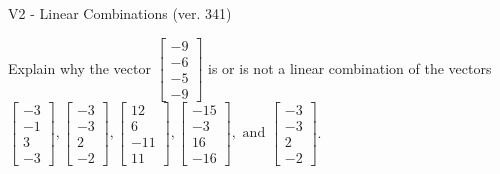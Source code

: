 \begin{exercise}
  \begin{exerciseTitle}V2 - Linear Combinations (ver. 341)\end{exerciseTitle}
  \begin{exerciseStatement}
    Explain why the vector \(\left[\begin{array}{c}
-9 \\
-6 \\
-5 \\
-9
\end{array}\right]\)  is or is not a linear 
	combination of the vectors \(\left[\begin{array}{c}
-3 \\
-1 \\
3 \\
-3
\end{array}\right] , \left[\begin{array}{c}
-3 \\
-3 \\
2 \\
-2
\end{array}\right] , \left[\begin{array}{c}
12 \\
6 \\
-11 \\
11
\end{array}\right] , \left[\begin{array}{c}
-15 \\
-3 \\
16 \\
-16
\end{array}\right] , \text{ and } \left[\begin{array}{c}
-3 \\
-3 \\
2 \\
-2
\end{array}\right]\).
	



\end{exerciseStatement}
\end{exercise}
